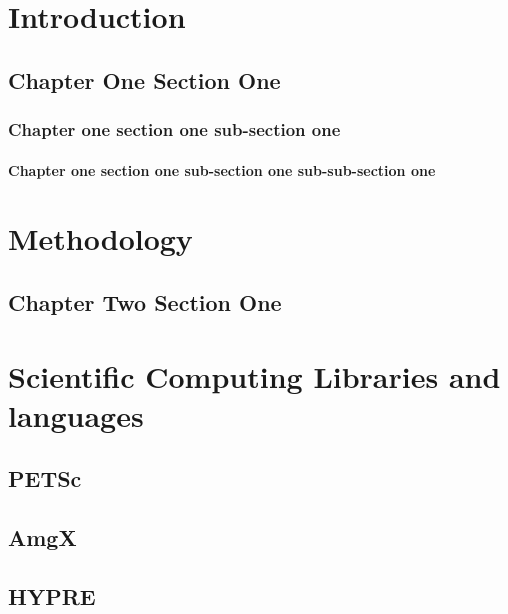 \chapter{Introduction}
\section{Chapter One Section One}
\subsection{Chapter one section one sub-section one}

\subsubsection{Chapter one section one sub-section one sub-sub-section one}

\chapter{Methodology}
\section{Chapter Two Section One}


\chapter{Scientific Computing Libraries and languages}
\section{PETSc}

\section{AmgX}

\section{HYPRE}





